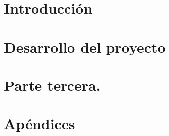 \documentclass[12pt,a4paper]{book} %
\begin{document}
\frontmatter

%

















\mainmatter

%

\part{Introducción}



\part{Desarrollo del proyecto}












\part{Parte tercera.}


\part{Apéndices}

\appendix



%

%

\backmatter




\end{document}
